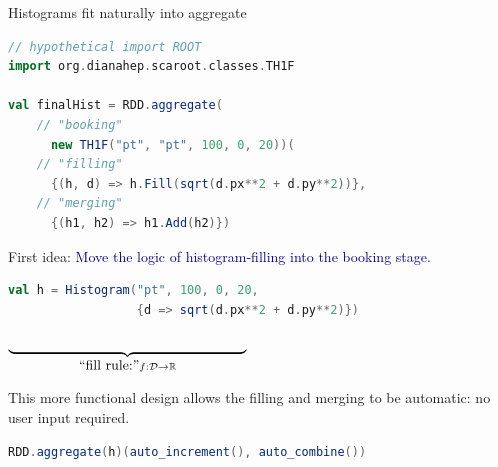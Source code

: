 \documentclass{beamer}
\begin{document}
\begin{frame}[fragile]{Histograms fit naturally into aggregate}

\begin{lstlisting}[language=scala]
// hypothetical import ROOT
import org.dianahep.scaroot.classes.TH1F

val finalHist = RDD.aggregate(
    // "booking"
      new TH1F("pt", "pt", 100, 0, 20))(
    // "filling"
      {(h, d) => h.Fill(sqrt(d.px**2 + d.py**2))},
    // "merging"
      {(h1, h2) => h1.Add(h2)})
\end{lstlisting}

\end{frame}

\begin{frame}[fragile]{First idea:}
\textcolor{darkblue}{\large Move the logic of histogram-filling into the booking stage.}

\begin{lstlisting}[language=scala]
val h = Histogram("pt", 100, 0, 20,
                  {d => sqrt(d.px**2 + d.py**2)})
\end{lstlisting}

\vspace{-\baselineskip} \hfill $\underbrace{\mbox{\hspace{6.0 cm}}}_{\mbox{``fill rule:''} f: \mathcal{D} \to \mathbb{R}}$ \hspace{0.7 cm}

\vfill
This more functional design allows the filling and merging to be automatic: no user input required.

\begin{lstlisting}[language=scala]
RDD.aggregate(h)(auto_increment(), auto_combine())
\end{lstlisting}
\end{frame}
\end{document}
